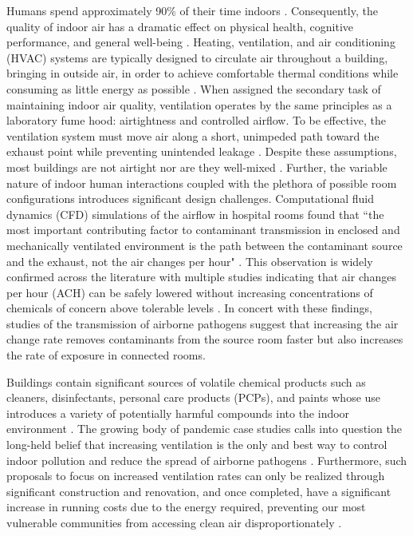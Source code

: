 Humans spend approximately 90\% of their time indoors \cite{finewax_quantification_2021}. Consequently, the quality of indoor air has a dramatic effect on physical health, cognitive performance, and general well-being \cite{Krebs2021AirPC, Gao2021ShorttermAP, Carneiro2021TheEO, Ni2021AssociationsOP, Shehab2019EffectsOS}. Heating, ventilation, and air conditioning (HVAC) systems are typically designed to circulate air throughout a building, bringing in outside air, in order to achieve comfortable thermal conditions while consuming as little energy as possible \cite{memarzadeh_role_2012}. When assigned the secondary task of maintaining indoor air quality, ventilation operates by the same principles as a laboratory fume hood: airtightness and controlled airflow. To be effective, the ventilation system must move air along a short, unimpeded path toward the exhaust point while preventing unintended leakage \cite{ng_iaq_2015}. Despite these assumptions, most buildings are not airtight nor are they well-mixed \cite{emmerich_investigation_2005}. Further, the variable nature of indoor human interactions coupled with the plethora of possible room configurations introduces significant design challenges. Computational fluid dynamics (CFD) simulations of the airflow in hospital rooms found that ``the most important contributing factor to contaminant transmission in enclosed and mechanically ventilated environment is the path between the contaminant source and the exhaust, not the air changes per hour" \cite{memarzadeh_role_2012}. This observation is widely confirmed across the literature with multiple studies indicating that air changes per hour (ACH) can be safely lowered without increasing concentrations of chemicals of concern above tolerable levels \cite{ng_iaq_2015, lamping_air_nodate, li_evaluation_2014}. In concert with these findings, studies of the transmission of airborne pathogens suggest that increasing the air change rate removes contaminants from the source room faster but also increases the rate of exposure in connected rooms.

Buildings contain significant sources of volatile chemical products such as cleaners, disinfectants, personal care products (PCPs), and paints whose use introduces a variety of potentially harmful compounds into the indoor environment \cite{finewax_quantification_2021}. The growing body of pandemic case studies calls into question the long-held belief that increasing ventilation is the only and best way to control indoor pollution and reduce the spread of airborne pathogens \cite{ng_iaq_2015, zaatari_impact_2016, pease_investigation_2021, zheng_covid-19_2021}. Furthermore, such proposals to focus on increased ventilation rates can only be realized through significant construction and renovation, and once completed, have a significant increase in running costs due to the energy required, preventing our most vulnerable communities from accessing clean air disproportionately \cite{lamping_air_nodate}.

